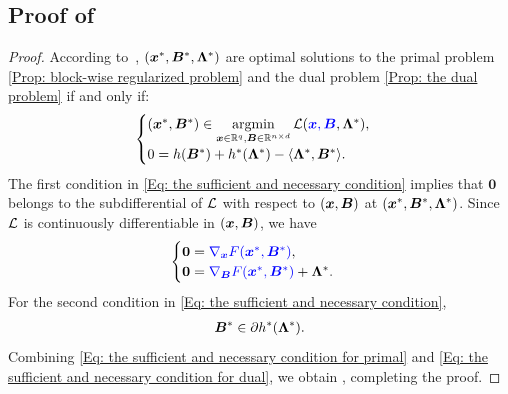 \subsection{Proof of }
\label{app:zero-gap-proof}
\begin{proof}
    According to~\cite[Theorem~2.158]{temporary-citekey-11039},
    $(\bm{x}^{*}, \bm{B}^{*}, \bm{\Lambda}^{*})$ are optimal solutions to the
    primal problem \eqref{Prop: block-wise regularized problem} and the dual problem
    \eqref{Prop: the dual problem}  if and only if:
    \begin{align}
        \label{Eq: the sufficient and necessary condition}
        \begin{cases}
        (\bx^{*}, \bB^{*}) \in \argmin\limits_{\bx \in \RR^{q}, \bB \in \RR^{n\times d}}\calL(\blue{\bx, \bB}, \bLmbd^{*}), \\
        0 = h(\bB^{*}) + h^{*}(\bLmbd^{*}) - \langle \bLmbd^{*}, \bB^{*}\rangle.
        \end{cases}
    \end{align}
    The first condition in \eqref{Eq: the sufficient and necessary condition} implies
    that $\bm{0}$ belongs to the subdifferential of $\mathcal{L}$ with respect to
    $(\bm{x}, \bm{B})$ at $(\bm{x}^{*}, \bm{B}^{*}, \bm{\Lambda}^{*})$. Since $\mathcal{L}$
    is continuously differentiable in $(\bm{x}, \bm{B})$, we have
    \begin{align}
        \label{Eq: the sufficient and necessary condition for primal}
        \begin{cases}
        \bm{0} = \blue{\nabla_{\bx}F(\bx^{*}, \bB^{*})},\\
        \bm{0} = \blue{\nabla_{\bB}F(\bx^{*}, \bB^{*})} + \bLmbd^{*}.
        \end{cases}
    \end{align}
    For the second condition in \eqref{Eq: the sufficient and necessary condition},
    \begin{align}
        \label{Eq: the sufficient and necessary condition for dual}\bB^{*}\in \partial h^{*}(\bLmbd^{*}).
    \end{align}
    Combining \eqref{Eq: the sufficient and necessary condition for primal} and \eqref{Eq: the sufficient and necessary condition for dual}, we obtain , completing the proof.
\end{proof}

